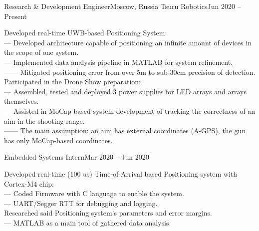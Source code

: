 \resumeSubheading
  {Research \& Development Engineer}{Moscow, Russia}
  {Tsuru Robotics}{Jun 2020 -- Present}
  \begin{itemize}[leftmargin=0in, label={}]
    \small{\item{
      {Developed real-time UWB-based Positioning System:}\\
      {— Developed architecture capable of positioning an infinite amount of devices in the scope of one system.}\\
      {— Implemented data analysis pipeline in MATLAB for system refinement.}\\
      {—— Mitigated positioning error from over 5m to sub-30cm precision of detection.}\\
      {Participated in the Drone Show preparation:}\\
      {— Assembled, tested and deployed 3 power supplies for LED arrays and arrays themselves.}\\
      {— Assisted in MoCap-based system development of tracking the correctness of an aim in the shooting range.}\\
      {—— The main assumption: an aim has external coordinates (A-GPS), the gun has only MoCap-based  coordinates.}
    }}
  \end{itemize}
\resumeSubSubheading
{Embedded Systems Intern}{Mar 2020 -- Jun 2020}
  \begin{itemize}[leftmargin=0in, label={}]
    \small{\item{
      {Developed real-time (100 us) Time-of-Arrival based Positioning system with Cortex-M4 chip:}\\
      {— Coded Firmware with C language to enable the system.}\\
      {— UART/Segger RTT for debugging and logging.}\\
      {Researched said Positioning system's parameters and error margins.}\\
      {— MATLAB as a main tool of gathered data analysis.}
    }}
  \end{itemize}